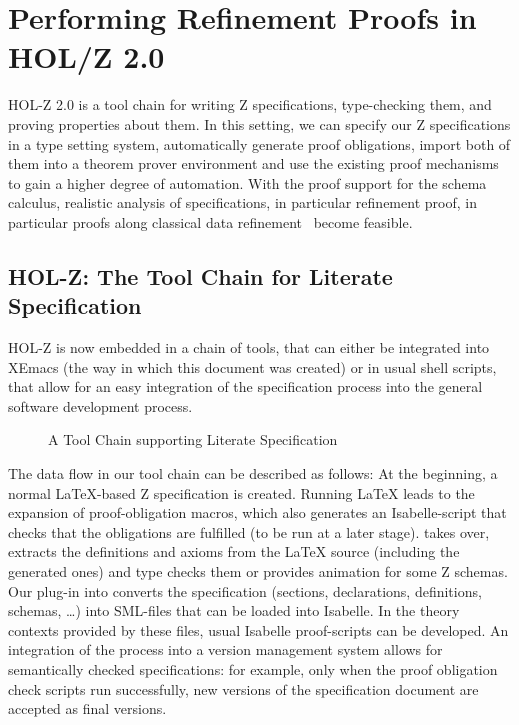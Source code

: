 \section{Performing Refinement Proofs in HOL/Z 2.0}\label{sec:holz}

HOL-Z 2.0 is a tool chain for writing Z specifications,
type-checking them, and proving properties about them. In this
setting, we can specify our Z specifications in a type setting system,
automatically generate proof obligations, import both of them into a
theorem prover environment and use the existing proof mechanisms to
gain a higher degree of automation.  With the proof support for the
schema calculus, realistic analysis of specifications, in particular
refinement proof, in particular proofs along classical data
refinement~\cite{spivey:z_notation:1992} become feasible.

\subsection{HOL-Z: The Tool Chain for Literate Specification}
HOL-Z is now embedded in a chain of tools, that can either be integrated into
XEmacs (the way in which this document was created) or in usual
shell scripts, that allow for an easy integration of the specification process
into the general software development process.
\begin{figure}
\centering\scalebox{.5}{}
\caption{A Tool Chain supporting Literate Specification\label{fig:tool-chain-supp}}
\end{figure}
The data flow in our tool chain can be described as follows: At the
beginning, a normal \LaTeX-based Z specification is created. Running
\LaTeX{} leads to the expansion of proof-obligation macros, which also
generates an Isabelle-script that checks that the
obligations are fulfilled (to be run at a later stage).  \Zeta{} takes
over, extracts the definitions and axioms from the \LaTeX{} source
(including the generated ones) and type checks them or provides
animation for some Z schemas.  Our plug-in into \Zeta{} converts the
specification (sections, declarations, definitions, schemas, \ldots)
into SML-files that can be loaded into Isabelle.  In the theory
contexts provided by these files, usual Isabelle proof-scripts can be
developed. An integration of the process into a version management
system allows for semantically checked specifications: for example,
only when the proof obligation check scripts run successfully, new
versions of the specification document are accepted as final versions.

